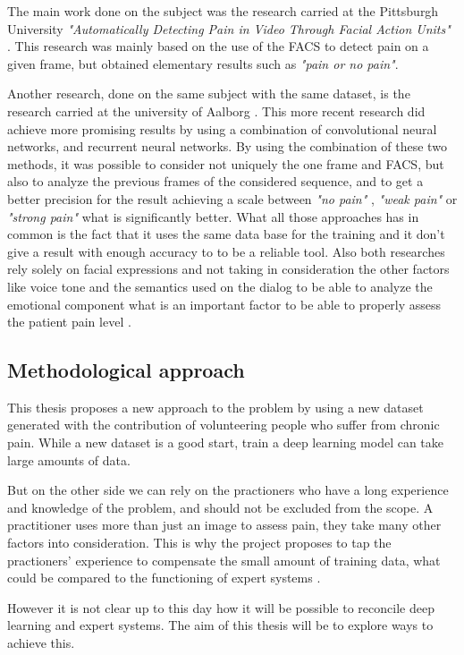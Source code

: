 \documentclass[11pt]{article}
\begin{document}
The main work done on the subject was the research carried at the  Pittsburgh
University \emph{"Automatically Detecting Pain in Video Through Facial Action
Units"} \cite{lucey2011automatically}. This research was mainly based on the
use of the FACS to detect pain on a given frame, but obtained elementary
results such as \emph{"pain or no pain"}.

Another research, done on the same subject with the same dataset, is the
research carried at the university of Aalborg \cite{bellantonio2016spatio}.
This more recent research did achieve more promising results by using a
combination of convolutional neural networks, and recurrent neural networks.
By using the combination of these two methods, it was possible to consider
not uniquely the one frame and FACS, but also to analyze the previous frames
of the considered sequence, and to get a better precision for the result
achieving a scale between \emph{"no pain"} , \emph{"weak pain"} or \emph{"strong pain"} what
is significantly better.
What all those approaches has in common is the fact that it uses the same
data base for the training and it don't give a result with enough accuracy to
to be a reliable tool. Also both researches rely solely on facial expressions
and not taking in consideration the other factors like voice tone and the
semantics used on the dialog to be able to analyze the emotional component
what is an important factor to be able to properly assess the patient pain
level \cite{hale1997emotional}.

\subsection{Methodological approach}
\label{sec:org6b11f7d}
This thesis proposes a new approach to the problem by using a new dataset
generated with the contribution of volunteering people who suffer from
chronic pain. While a new dataset is a good start, train a deep learning
model can take large amounts of data.

But on the other side we can rely on the practioners who have a long experience and
knowledge of the problem, and should not be excluded from the scope.
A practitioner uses more than just an image to assess pain, they take many other
factors into consideration. This is why the project proposes to tap the
practioners' experience to compensate the small amount of training data, what
could be compared to the functioning of expert systems
\cite{giarratano1998expert}.

However it is not clear up to this day how it will be possible to reconcile deep
learning and expert systems. The aim of this thesis will be to explore ways
to achieve this.
\end{document}
